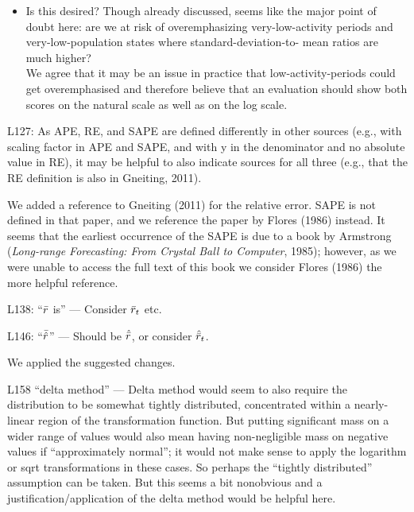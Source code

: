 \documentclass{article}
\newcommand{\black}{\color{black}}
\newcommand{\blue}{\color{blue}}
\begin{document}
\begin{itemize}
    \item \blue Is this desired? Though already discussed, seems like the major point of doubt here: are we at risk of overemphasizing very-low-activity periods and very-low-population states where standard-deviation-to- mean ratios are much higher?\\
    \black We agree that it may be an issue in practice that low-activity-periods could get overemphasised and therefore believe that an evaluation should show both scores on the natural scale as well as on the log scale. 
\end{itemize}







\blue

L127: As APE, RE, and SAPE are defined differently in other sources (e.g., with scaling factor in APE and SAPE, and with y in the denominator and no absolute value in RE), it may be helpful to also indicate sources for all three (e.g., that the RE definition is also in Gneiting, 2011).

\black
We added a reference to Gneiting (2011) for the relative error. SAPE is not defined in that paper, and we reference the paper by Flores (1986) instead. It seems that the earliest occurrence of the SAPE is due to a book by Armstrong (\textit{Long-range Forecasting: From Crystal Ball to Computer}, 1985); however, as we were unable to access the full text of this book we consider Flores (1986) the more helpful reference.

\blue

L138: “$\Bar{r}$ is” — Consider $\Bar{r}_t$ etc.

L146: “$\Bar{\hat{r}}$” — Should be $\hat{\Bar{r}}$, or consider $\hat{\Bar{r}}_t$.

\black
We applied the suggested changes.

\blue
L158 “delta method” — Delta method would seem to also require the distribution to be somewhat tightly distributed, concentrated within a nearly-linear region of the transformation function. But putting significant mass on a wider range of values would also mean having non-negligible mass on negative values if “approximately normal”; it would not make sense to apply the logarithm or sqrt transformations in these cases. So perhaps the “tightly distributed” assumption can be taken. But this seems a bit nonobvious and a justification/application of the delta method would be helpful here.
\end{document}
